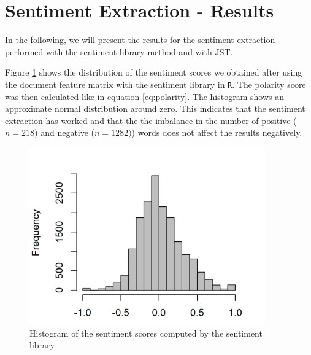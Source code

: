 \section{Sentiment Extraction - Results}\label{SentimentExtract}
In the following, we will present the results for the sentiment extraction performed with the sentiment library method and with JST. 

Figure \ref{fig:BoWSentiment} shows the distribution of the sentiment scores we obtained after using the document feature matrix \citep{quanteda} with the sentiment library in \texttt{R}. The polarity score was then calculated like in equation \ref{eq:polarity}. The histogram shows an approximate normal distribution around zero. This indicates that the sentiment extraction has worked and that the the imbalance in the number of positive ($n = 218$) and negative ($n = 1282)$) words does not affect the results negatively. 

\begin{figure}[h]
\centering
\includegraphics[width=4in]{figures/2SentimentsBOW_Histogram.png}
\caption{Histogram of the sentiment scores computed by the sentiment library}
\label{fig:BoWSentiment}
\end{figure}

